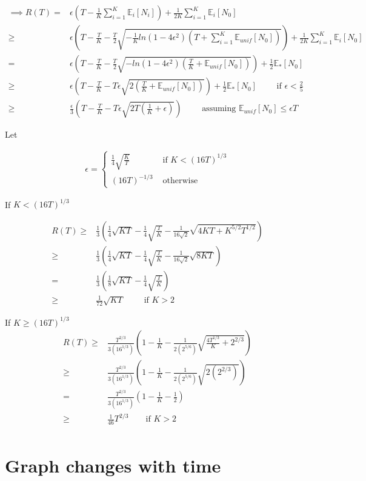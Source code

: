 \documentclass{article}
\newcommand{\E}{\mathbb E}
\newcommand{\eqn}[1]{\begin{align}#1\end{align}}
\newcommand{\Ei}[1]{\E_i\left[ #1 \right]}
\newcommand{\Eu}[1]{\E_{unif}\left[ #1 \right]}
\newcommand{\Es}[1]{\E_{*}\left[ #1 \right]}
\theoremstyle{plain}
\theoremstyle{definition}
\begin{document}
\eqn {
\implies R(T) =& \epsilon \left(T -\frac{1}{K}\sum_{i=1}^K\Ei{N_i}\right) + \frac{1}{2K}\sum_{i=1}^K\Ei{N_0}\\
\geq & \epsilon \left(T -\frac{T}{K} - \frac{T}{2}\sqrt{-\frac{1}{K}ln(1-4\epsilon^2) (T + \sum_{i=1}^K \Eu{N_0})} \right) + \frac{1}{2K}\sum_{i=1}^K\Ei{N_0}  \\
\label{eqn:graph_regret1}
=& \epsilon \left(T -\frac{T}{K} - \frac{T}{2}\sqrt{-ln(1-4\epsilon^2) (\frac{T}{K} +  \Eu{N_0})} \right) + \frac{1}{2}\Es{N_0}\\
\geq & \epsilon \left(T -\frac{T}{K} - T\epsilon \sqrt{2(\frac{T}{K} +  \Eu{N_0})} \right) + \frac{1}{2}\Es{N_0} \qquad \text{ if } \epsilon < \frac{2}{5} \\
\geq & \frac{\epsilon}{3} \left(T -\frac{T}{K} - T\epsilon \sqrt{2T(\frac{1}{K} +  \epsilon)} \right) \qquad \text{ assuming } \Eu{N_0} \leq \epsilon T 
}

Let 

\eqn {
\epsilon = \begin{cases}
\frac{1}{4}\sqrt{\frac{K}{T}} & \text{ if } K < (16T)^{1/3}\\
(16T)^{-1/3} & \text { otherwise }
\end{cases}
}

If $K < (16T)^{1/3}$

\eqn {
R(T) \geq & \frac{1}{3}\left(\frac{1}{4}\sqrt{KT} - \frac{1}{4}\sqrt{\frac{T}{K}} - \frac{1}{16\sqrt{2}}\sqrt{4KT + K^{5/2}T^{1/2}}\right)\\
\geq & \frac{1}{3}\left(\frac{1}{4}\sqrt{KT} - \frac{1}{4}\sqrt{\frac{T}{K}} - \frac{1}{16\sqrt{2}}\sqrt{8KT}\right)\\
=& \frac{1}{3}\left(\frac{1}{8}\sqrt{KT} - \frac{1}{4}\sqrt{\frac{T}{K}}\right) \\
\geq & \frac{1}{72}\sqrt{KT} \qquad \text{ if } K > 2
}

If  $K \geq (16T)^{1/3}$
\eqn {
R(T) \geq & \frac{T^{2/3}}{3(16^{1/3})}\left(1  - \frac{1}{K} - \frac{1}{2(2^{5/6})}\sqrt{\frac{4T^{1/3}}{K}+2^{2/3}}\right)\\
 \geq & \frac{T^{2/3}}{3(16^{1/3})}\left(1  - \frac{1}{K} - \frac{1}{2(2^{5/6})}\sqrt{2(2^{2/3})}\right)\\
 = & \frac{T^{2/3}}{3(16^{1/3})}\left(1  - \frac{1}{K} - \frac{1}{2}\right)\\
 \geq & \frac{1}{46}T^{2/3} \qquad \text {if } K > 2\\
}

\pagebreak

\section{Graph changes with time}
\end{document}
